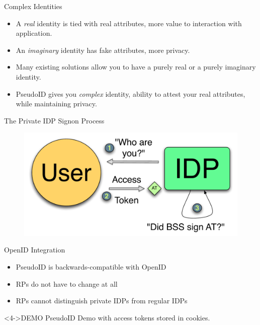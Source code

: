 \documentclass[handout]{beamer}
\begin{document}
\begin{frame}{Complex Identities}
  \begin{itemize}
    \item<1-> A \emph{real} identity is tied with real attributes, more value to
    interaction with application.
    \item<2-> An \emph{imaginary} identity has fake attributes, more privacy.
    \item<3-> Many existing solutions allow you to have a purely real or a
    purely imaginary identity.
    \item<4-> PseudoID gives you \emph{complex} identity, ability to attest your
    real attributes, while maintaining privacy.
  \end{itemize}
\end{frame}

\begin{frame}{The Private IDP Signon Process}
  \begin{figure}
    \centering
    \includegraphics[scale=0.5]{figs/fig-bss-signon-color.pdf}
  \end{figure}
\end{frame}

\begin{frame}{OpenID Integration}

\begin{itemize}
  \item<1-> PseudoID is backwards-compatible with OpenID
  \item<2-> RPs do not have to change at all
  \item<3-> RPs cannot distinguish private IDPs from regular IDPs
\end{itemize}

\begin{alertblock}<4->{DEMO}
PseudoID Demo with access tokens stored in cookies.
\end{alertblock}
\end{frame}
\end{document}
